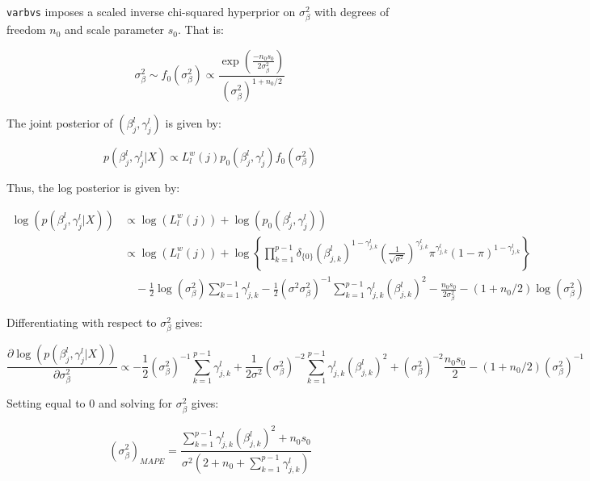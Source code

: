 \documentclass[twoside]{article}
\newcommand{\1}{\\[1ex]}
\newcommand{\2}{\\[2ex]}
\newcommand{\3}{\\[3ex]}
\newcommand{\4}{\\[4ex]}
\begin{document}
\texttt{varbvs} imposes a scaled inverse chi-squared hyperprior on $\sigma^2_\beta$ with degrees of freedom $n_0$ and scale parameter $s_0$. That is:

\begin{equation}
\sigma^2_\beta \sim f_0(\sigma^2_\beta) \propto \frac{\exp\left(\frac{-n_0s_0}{2\sigma^2_\beta}\right)}{{(\sigma^2_\beta)^{1 + n_0/2}}}
\end{equation}


The joint posterior of $(\beta_j^l,\gamma_j^l)$ is given by:

\begin{equation}
p(\beta_j^l,\gamma_j^l|X)\propto L_l^w(j)p_0(\beta_j^l, \gamma_j^l)f_0(\sigma^2_\beta)
\end{equation}

Thus, the log posterior is given by:

\begin{align}
\log(p(\beta_j^l,\gamma_j^l|X)) & \propto \log(L_l^w(j)) + \log(p_0(\beta_j^l, \gamma_j^l))  \\
& \propto \log(L_l^w(j)) + \log\left\{\prod_{k = 1}^{p - 1}\delta_{\{0\}}\left(\beta_{j,k}^l\right)^{1- \gamma_{j,k}^l}\left(\frac1{\sqrt{\sigma^2}}\right)^{\gamma_{j,k}^l}\pi^{\gamma_{j,k}^l}(1-\pi)^{1-\gamma_{j,k}^l}\right\}\\
& \quad -\frac12\log(\sigma^2_\beta) \sum_{k = 1}^{p-1}\gamma_{j,k}^l - \frac12(\sigma^2\sigma^2_\beta)^{-1}\sum_{k=1}^{p-1}\gamma_{j,k}^l(\beta_{j,k}^l)^2 - \frac{n_0s_0}{2\sigma^2_\beta}-(1 + n_0/2)\log(\sigma^2_\beta)
\end{align}

Differentiating with respect to $\sigma^2_\beta$ gives:

\begin{equation}
\frac{\partial\log(p(\beta_j^l,\gamma_j^l|X))}{\partial\sigma^2_\beta}\propto -\frac12(\sigma^2_\beta)^{-1} \sum_{k = 1}^{p-1}\gamma_{j,k}^l + \frac1{2\sigma^2}(\sigma^2_\beta)^{-2}\sum_{k=1}^{p-1}\gamma_{j,k}^l(\beta_{j,k}^l)^2 +(\sigma^2_\beta)^{-2}\frac{n_0s_0}{2}-(1 + n_0/2)(\sigma^2_\beta)^{-1}
\end{equation}

Setting equal to 0 and solving for $\sigma^2_\beta$ gives:

\begin{equation}
(\sigma^2_\beta)_{\textit{MAPE}} = \frac{\sum_{k=1}^{p-1}\gamma_{j,k}^l(\beta_{j,k}^l)^2 + n_0s_0}{\sigma^2(2 + n_0 + \sum_{k=1}^{p-1}\gamma_{j,k}^l)}
\end{equation}
\end{document}
